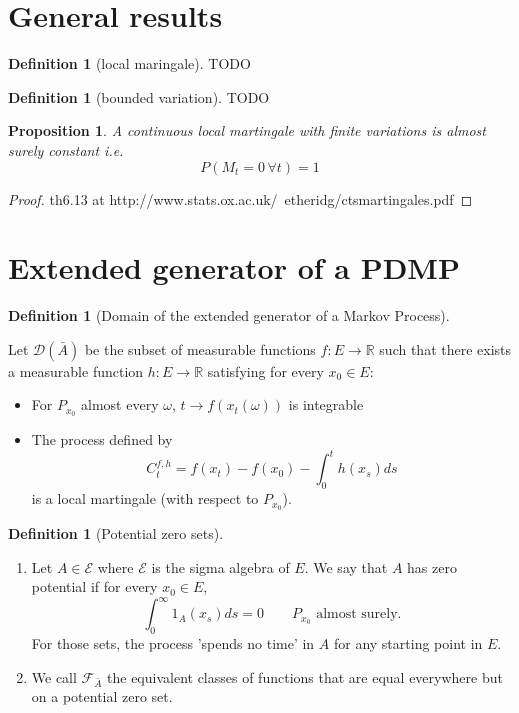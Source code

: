 \documentclass[11pt]{amsart}
\newtheorem{proposition}[theorem]{Proposition}
\theoremstyle{definition}
\newtheorem{definition}[theorem]{Definition}
\theoremstyle{remark}
\newcommand{\depends}[1]{}
\newcommand{\summary}[1]{}
\newcommand{\mainText}[1]{#1}
\newcommand{\extgen}{\bar{A}}
\newcommand{\Feqgen}{\mathcal{F}_{\extgen}}
\begin{document}
\section{General results}\label{sec:general-res}

\begin{definition}[local maringale]\label{def:loc-martingale}
TODO
\end{definition}

\begin{definition}[bounded variation]\label{def:bounded-variation}
TODO
\end{definition}

\begin{proposition}\label{prop:loc-martingale-finite-variation-cst}
A continuous local martingale with finite variations is almost surely constant i.e.
\[
	P(M_t = 0 \, \forall t) = 1
\]
\end{proposition}
\begin{proof}
th6.13 at 
http://www.stats.ox.ac.uk/~etheridg/ctsmartingales.pdf
\end{proof}

\section{Extended generator of a PDMP}\label{sec:Ext-gen-Markov}
\depends{}

\begin{definition}[Domain of the extended generator of a Markov Process]\label{def:ext-gen-domain}
\depends{def:loc-martingale}
\summary{TEST SUMMARY}
\mainText{Let $\mathcal{D}(\extgen)$ be the subset of measurable functions $f:E\rightarrow \mathbb{R}$ such that there 
exists a measurable function $h: E \rightarrow \mathbb{R}$ satisfying for every $x_0\in E$:
\begin{itemize}
	\item For $P_{x_0}$ almost every $\omega$, $t\rightarrow f(x_t(\omega))$ is integrable
	\item The process defined by
	\[
		C_t^{f,h} = f(x_t) - f(x_0) - \int_0^t h(x_s) ds
	\]
	is a local martingale (with respect to $P_{x_0}$).
\end{itemize}}
\end{definition}

\begin{definition}[Potential zero sets]\label{def:potential-zero-set}
\begin{enumerate}
\item Let $A \in \mathcal{E}$ where $\mathcal{E}$ is the sigma algebra of $E$. We say that $A$ has zero potential if for every $x_0\in E$, 
\[
	\int_0^\infty 1_A(x_s) ds = 0 \qquad P_{x_0} \text{ almost surely}.
\]
For those sets, the process 'spends no time' in $A$ for any starting point in $E$. 
\item We call $\Feqgen$ the equivalent classes of functions that are equal everywhere but on a potential zero set.
\end{enumerate}
\end{definition}
\end{document}
